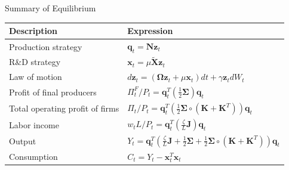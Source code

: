 \documentclass[
  10pt,
  aspectratio=169,   %
]{beamer}
\theoremstyle{plain}
\begin{document}
\begin{frame}{Summary of Equilibrium}
  \label{summary}
  \begin{center}
    \begin{tabular}{ll}
      Description                     & Expression\tabularnewline
      \hline
      Production strategy             & $\bm{q}_{t}=\bm{N}\bm{z}_{t}$\tabularnewline
      R\&D strategy                   & $\bm{x}_{t}=\mu\tilde{\bm{X}}\bm{z}_{t}$\tabularnewline
      Law of motion                   & $d\bm{z}_{t}=\left(\bm{\Omega}\bm{z}_{t}+\mu\bm{x}_{t}\right)dt+\gamma\bm{z}_{t}dW_{t}$\tabularnewline
      Profit of final producers       & $\Pi_{t}^{F}/P_{t}=\bm{q}_{t}^{T}\left(\frac{1}{2}\bm{\Sigma}\right)\bm{q}_{t}$\tabularnewline
      Total operating profit of firms & $\Pi_{t}/P_{t}=\bm{q}_{t}^{T}\left(\frac{1}{2}\bm{\Sigma}\circ\left(\bm{K}+\bm{K}^{T}\right)\right)\bm{q}_{t}$\tabularnewline
      Labor income                    & $w_{t}L/P_{t}=\bm{q}_{t}^{T}\left(\frac{\zeta}{L}\bm{J}\right)\bm{q}_{t}$\tabularnewline
      Output                          & $Y_{t}=\bm{q}_{t}^{T}\left(\frac{\zeta}{L}\bm{J}+\frac{1}{2}\bm{\Sigma}+\frac{1}{2}\bm{\Sigma}\circ\left(\bm{K}+\bm{K}^{T}\right)\right)\bm{q}_{t}$\tabularnewline
      Consumption                     & $C_{t}=Y_{t}-\bm{x}_{t}^{T}\bm{x}_{t}$\tabularnewline
    \end{tabular}
  \end{center}
  \hyperlink{aggregation}{}
\end{frame}
\end{document}

